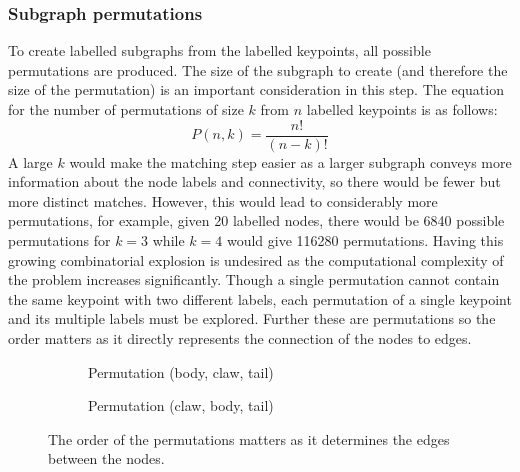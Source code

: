 \subsubsection{Subgraph permutations}
To create labelled subgraphs from the labelled keypoints, all possible permutations are produced. The size of the subgraph to create (and therefore the size of the permutation) is an important consideration in this step. The equation for the number of permutations of size $k$ from $n$ labelled keypoints is as follows:
\begin{equation}
P(n, k) = \frac{n!}{(n-k)!}
\end{equation}
A large $k$ would make the matching step easier as a larger subgraph conveys more information about the node labels and connectivity, so there would be fewer but more distinct matches. However, this would lead to considerably more permutations, for example, given 20 labelled nodes, there would be 6840 possible permutations for $k=3$ while $k=4$ would give 116280 permutations. Having this growing combinatorial explosion is undesired as the computational complexity of the problem increases significantly. Though a single permutation cannot contain the same keypoint with two different labels, each permutation of a single keypoint and its multiple labels must be explored. Further these are permutations so the order matters as it directly represents the connection of the nodes to edges.
\begin{figure}[H]
\centering
	\begin{subfigure}{0.45\textwidth}
	\centering
	\caption{Permutation (body, claw, tail)}
	\end{subfigure}
	\hspace*{\fill}
	\begin{subfigure}{0.45\textwidth}
	\centering
	\caption{Permutation (claw, body, tail)}
	\end{subfigure}
\caption{The order of the permutations matters as it determines the edges between the nodes.}
\end{figure}
